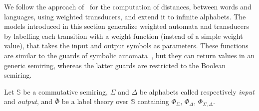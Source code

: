 \documentclass[runningheads]{llncs}
\newcommand{\Semiring}{\mathbb{S}}
\begin{document}
We follow the approach of~\cite{Mohri03EDWA} for the computation of distances,
between words and languages, using weighted transducers, 
and extend it to infinite alphabets.
%
The models introduced in this section generalize 
weighted automata and transducers~\cite{Droste09handbook} 
by labelling each transition with a weight function (instead of a simple weight value), 
that takes the input and output symbols as parameters. 
These functions are similar to the guards of symbolic automata~\cite{dAntoniVeanes17CAV,dAntoni21CACM},
but they can return values in an generic semiring, 
whereas the latter guards are restricted to the Boolean semiring.


\noindent 
Let $\Semiring$ be a commutative semiring, 
$\Sigma$ and $\Delta$ be alphabets called respectively \emph{input} and \emph{output}, %
and $\bar\Phi$ be a label theory over $\Semiring$
containing $\Phi_\Sigma$, $\Phi_\Delta$, $\Phi_{\Sigma, \Delta}$.
\end{document}
